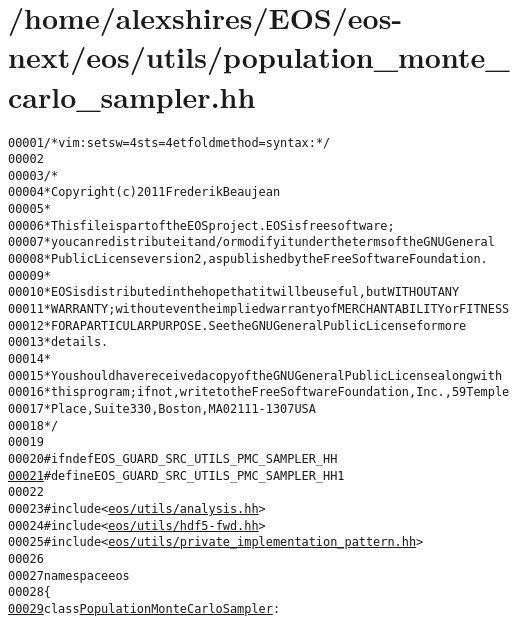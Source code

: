 \hypertarget{population__monte__carlo__sampler_8hh_source}{
\section{/home/alexshires/EOS/eos-\/next/eos/utils/population\_\-monte\_\-carlo\_\-sampler.hh}
}


\begin{footnotesize}\begin{alltt}
00001 \textcolor{comment}{/* vim: set sw=4 sts=4 et foldmethod=syntax : */}
00002 
00003 \textcolor{comment}{/*}
00004 \textcolor{comment}{ * Copyright (c) 2011 Frederik Beaujean}
00005 \textcolor{comment}{ *}
00006 \textcolor{comment}{ * This file is part of the EOS project. EOS is free software;}
00007 \textcolor{comment}{ * you can redistribute it and/or modify it under the terms of the GNU General}
00008 \textcolor{comment}{ * Public License version 2, as published by the Free Software Foundation.}
00009 \textcolor{comment}{ *}
00010 \textcolor{comment}{ * EOS is distributed in the hope that it will be useful, but WITHOUT ANY}
00011 \textcolor{comment}{ * WARRANTY; without even the implied warranty of MERCHANTABILITY or FITNESS}
00012 \textcolor{comment}{ * FOR A PARTICULAR PURPOSE.  See the GNU General Public License for more}
00013 \textcolor{comment}{ * details.}
00014 \textcolor{comment}{ *}
00015 \textcolor{comment}{ * You should have received a copy of the GNU General Public License along with}
00016 \textcolor{comment}{ * this program; if not, write to the Free Software Foundation, Inc., 59 Temple}
00017 \textcolor{comment}{ * Place, Suite 330, Boston, MA  02111-1307  USA}
00018 \textcolor{comment}{ */}
00019 
00020 \textcolor{preprocessor}{#ifndef EOS\_GUARD\_SRC\_UTILS\_PMC\_SAMPLER\_HH}
\hypertarget{population__monte__carlo__sampler_8hh_source_l00021}{}\hyperlink{population__monte__carlo__sampler_8hh_ae7e0494552bb66a66453c50c27203a49}{00021} \textcolor{preprocessor}{}\textcolor{preprocessor}{#define EOS\_GUARD\_SRC\_UTILS\_PMC\_SAMPLER\_HH 1}
00022 \textcolor{preprocessor}{}
00023 \textcolor{preprocessor}{#include <\hyperlink{analysis_8hh}{eos/utils/analysis.hh}>}
00024 \textcolor{preprocessor}{#include <\hyperlink{hdf5-fwd_8hh}{eos/utils/hdf5-fwd.hh}>}
00025 \textcolor{preprocessor}{#include <\hyperlink{private__implementation__pattern_8hh}{eos/utils/private_implementation_pattern.hh}>}
00026 
00027 \textcolor{keyword}{namespace }eos
00028 \{
\hypertarget{population__monte__carlo__sampler_8hh_source_l00029}{}\hyperlink{classeos_1_1PopulationMonteCarloSampler}{00029}     \textcolor{keyword}{class }\hyperlink{classeos_1_1PopulationMonteCarloSampler}{PopulationMonteCarloSampler} :

\end{alltt}
\end{footnotesize}
